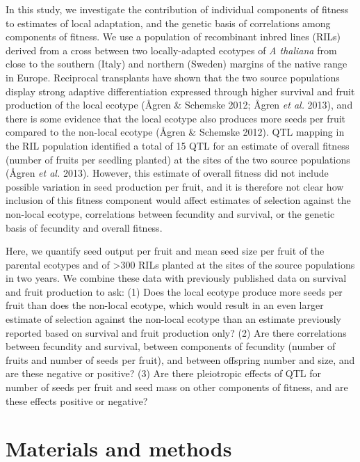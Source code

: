 \documentclass[]{article}
\begin{document}
In this study, we investigate the contribution of individual components of fitness to estimates of local adaptation, and the genetic basis of correlations among components of fitness. We use a population of recombinant inbred lines (RILs) derived from a cross between two locally-adapted ecotypes of \emph{A thaliana} from close to the southern (Italy) and northern (Sweden) margins of the native range in Europe. Reciprocal transplants have shown that the two source populations display strong adaptive differentiation expressed through higher survival and fruit production of the local ecotype (Ågren \& Schemske 2012; Ågren \emph{et al.} 2013), and there is some evidence that the local ecotype also produces more seeds per fruit compared to the non-local ecotype (Ågren \& Schemske 2012). QTL mapping in the RIL population identified a total of 15 QTL for an estimate of overall fitness (number of fruits per seedling planted) at the sites of the two source populations (Ågren \emph{et al.} 2013). However, this estimate of overall fitness did not include possible variation in seed production per fruit, and it is therefore not clear how inclusion of this fitness component would affect estimates of selection against the non-local ecotype, correlations between fecundity and survival, or the genetic basis of fecundity and overall fitness.

Here, we quantify seed output per fruit and mean seed size per fruit of the parental ecotypes and of \textgreater{}300 RILs planted at the sites of the source populations in two years. We combine these data with previously published data on survival and fruit production to ask: (1) Does the local ecotype produce more seeds per fruit than does the non-local ecotype, which would result in an even larger estimate of selection against the non-local ecotype than an estimate previously reported based on survival and fruit production only? (2) Are there correlations between fecundity and survival, between components of fecundity (number of fruits and number of seeds per fruit), and between offspring number and size, and are these negative or positive? (3) Are there pleiotropic effects of QTL for number of seeds per fruit and seed mass on other components of fitness, and are these effects positive or negative?

\hypertarget{materials-and-methods}{%
\section{Materials and methods}\label{materials-and-methods}}
\end{document}
